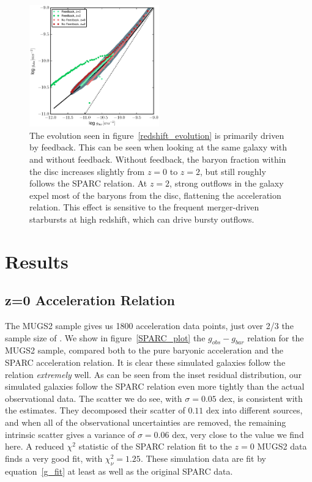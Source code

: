 \begin{figure}
    \includegraphics[width=0.5\textwidth]{figures4/FB_effects.eps}
    \caption[Feedback effects on acceleration relation]{The evolution seen in
    figure~\ref{redshift_evolution} is primarily driven by feedback.  This can
    be seen when looking at the same galaxy with and without feedback.  Without
    feedback, the baryon fraction within the disc increases slightly from $z=0$
    to $z=2$, but still roughly follows the SPARC relation.  At $z=2$, strong
    outflows in the galaxy expel most of the baryons from the disc, flattening
    the acceleration relation.  This effect is sensitive to the frequent
    merger-driven starbursts at high redshift, which can drive bursty outflows.}
    \label{FB_effects}
\end{figure}
\section{Results}
\subsection{z=0 Acceleration Relation}
The MUGS2 sample gives us 1800 acceleration data points, just over 2/3 the
sample size of \citet{McGaugh2016}. We show in figure~\ref{SPARC_plot} the
$g_{obs}-g_{bar}$ relation for the MUGS2 sample, compared both to the pure
baryonic acceleration and the SPARC acceleration relation.  It is clear these
simulated galaxies follow the \citet{McGaugh2016} relation {\it extremely} well.
As can be seen from the inset residual distribution, our simulated galaxies
follow the SPARC relation even more tightly than the actual observational data.
The scatter we do see, with $\sigma=0.05$ dex, is consistent with the
\citet{McGaugh2016} estimates.  They decomposed their scatter of $0.11$
dex into different sources, and when all of the observational uncertainties are
removed, the remaining intrinsic scatter gives a variance of $\sigma=0.06$ dex,
very close to the value we find here.  A reduced $\chi^2$ statistic of the SPARC
relation fit to the $z=0$ MUGS2 data finds a very good fit, with $\chi^2_\nu =
1.25$.  These simulation data are fit by equation~\ref{g_fit} at least as well
as the original SPARC data.

